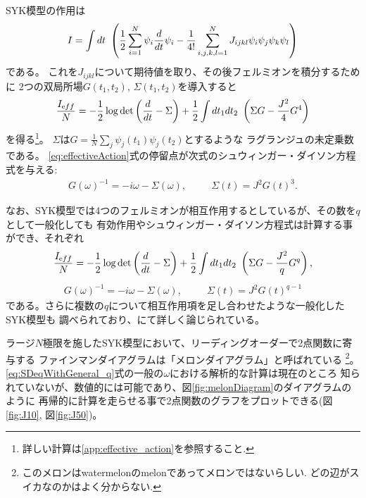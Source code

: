 SYK模型の作用は
\begin{align}
  I = \int dt\ \left(\frac{1}{2}\sum_{i = 1}^{N} \psi_i \frac{d}{dt} \psi_i
		- \frac{1}{4!} \sum_{i,j,k,l = 1}^{N} J_{ijkl} \psi_i\psi_j\psi_k\psi_l
    \right)
\end{align}
である。
これを$J_{ijkl}$について期待値を取り、その後フェルミオンを積分するために
2つの双局所場$G(t_1, t_2)$, $\Sigma(t_1, t_2)$を導入すると
\begin{align}
  \frac{I_{\mathrm eff}}{N} =
		- \frac{1}{2}\log\det\left(\frac{d}{dt} - \Sigma\right)
		+ \frac{1}{2}\int dt_1dt_2\ \left(\Sigma G - \frac{J^2}{4}G^4\right)
  \label{eq:effectiveAction}
\end{align}
を得る\footnote{詳しい計算は\ref{app:effective_action}を参照すること.}。
$\Sigma$は$G = \frac{1}{N}\sum_j \psi_j(t_1)\psi_j(t_2)$とするような
ラグランジュの未定乗数である。
\eqref{eq:effectiveAction}式の停留点が次式のシュウィンガー・ダイソン方程式を与える:
\begin{align}
  G(\omega)^{-1} = -i\omega - \Sigma(\omega),
  \hspace{30pt}
  \Sigma(t) = J^2G(t)^3.
  \label{eq:SDeq}
\end{align}

なお、SYK模型では4つのフェルミオンが相互作用するとしているが、その数を$q$として一般化しても
有効作用やシュウィンガー・ダイソン方程式は計算する事ができ、それぞれ
\begin{align}
  \frac{I_{\mathrm eff}}{N} =
		- \frac{1}{2}\log\det\left(\frac{d}{dt} - \Sigma\right)
		+ \frac{1}{2}\int dt_1dt_2\ \left(\Sigma G - \frac{J^2}{q}G^q\right),
  \label{eq:effectiveActionWithGeneral_q}
\end{align}
\begin{align}
  G(\omega)^{-1} = -i\omega - \Sigma(\omega),
  \hspace{30pt}
  \Sigma(t) = J^2G(t)^{q-1}
  \label{eq:SDeqWithGeneral_q}
\end{align}
である。さらに複数の$q$について相互作用項を足し合わせたような一般化したSYK模型も
調べられており、\cite{gross}にて詳しく論じられている。

ラージ$N$極限を施したSYK模型において、リーディングオーダーで2点関数に寄与する
ファインマンダイアグラムは「メロンダイアグラム」と呼ばれている
\footnote{このメロンはwatermelonのmelonであってメロンではないらしい.
どの辺がスイカなのかはよく分からない.}。
\eqref{eq:SDeqWithGeneral_q}式の一般の$\omega$における解析的な計算は現在のところ
知られていないが、数値的には可能であり、図\ref{fig:melonDiagram}のダイアグラムのように
再帰的に計算を走らせる事で2点関数のグラフをプロットできる(図\ref{fig:J10}, 図\ref{fig:J50})。

